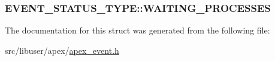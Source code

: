 \subsubsection[{\texorpdfstring{W\+A\+I\+T\+I\+N\+G\+\_\+\+P\+R\+O\+C\+E\+S\+S\+ES}{WAITING_PROCESSES}}]{ E\+V\+E\+N\+T\+\_\+\+S\+T\+A\+T\+U\+S\+\_\+\+T\+Y\+P\+E\+::\+W\+A\+I\+T\+I\+N\+G\+\_\+\+P\+R\+O\+C\+E\+S\+S\+ES}\hypertarget{structEVENT__STATUS__TYPE_a298376f128a83534e4ddef39ed78664e}{}\label{structEVENT__STATUS__TYPE_a298376f128a83534e4ddef39ed78664e}


The documentation for this struct was generated from the following file\+:\begin{DoxyCompactItemize}
\item 
src/libuser/apex/\hyperlink{apex__event_8h}{apex\+\_\+event.\+h}\end{DoxyCompactItemize}
